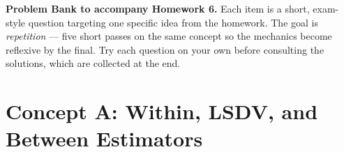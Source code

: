 \documentclass{article}
\begin{document}
\noindent\textbf{Problem Bank to accompany Homework 6.}  Each item is a short, exam-style question targeting one specific idea from the homework.  The goal is \emph{repetition} --- five short passes on the same concept so the mechanics become reflexive by the final.  Try each question on your own before consulting the solutions, which are collected at the end.

\bigskip

\section*{Concept A: Within, LSDV, and Between Estimators}
\end{document}
